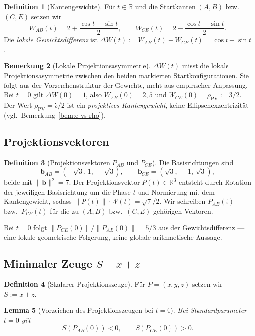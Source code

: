 \documentclass[11pt,a4paper]{article}
\theoremstyle{definition}
\newtheorem{definition}{Definition}[section]
\newtheorem{bemerkung}[definition]{Bemerkung}
\theoremstyle{plain}
\newtheorem{lemma}[definition]{Lemma}
\newcommand{\R}{\mathbb{R}}
\newcommand{\rhoPV}{\rho_{\mathrm{PV}}}
\begin{document}
	\begin{definition}[Kantengewichte]
		Für $t\in\R$ und die Startkanten $(A,B)$ bzw.\ $(C,E)$ setzen wir
		\[
		W_{AB}(t)=2+\frac{\cos t-\sin t}{2},
		\qquad
		W_{CE}(t)=2-\frac{\cos t-\sin t}{2}.
		\]
		Die \emph{lokale Gewichtsdifferenz} ist $\Delta W(t):=W_{AB}(t)-W_{CE}(t)=\cos t-\sin t$.
	\end{definition}
	
	\begin{bemerkung}[Lokale Projektionsasymmetrie]
		$\Delta W(t)$ misst die lokale Projektionsasymmetrie zwischen den beiden markierten Startkonfigurationen. Sie folgt aus der Vorzeichenstruktur der Gewichte, nicht aus empirischer Anpassung. Bei $t=0$ gilt $\Delta W(0)=1$, also $W_{AB}(0)=2{,}5$ und $W_{CE}(0)=\rhoPV:=3/2$. Der Wert $\rhoPV=3/2$ ist ein \emph{projektives Kantengewicht}, keine Ellipsenexzentrizität (vgl.\ Bemerkung~\ref{bem:e-vs-rho}).
	\end{bemerkung}
	
	\subsection{Projektionsvektoren}
	
	\begin{definition}[Projektionsvektoren $P_{AB}$ und $P_{CE}$]
		Die Basisrichtungen sind
		\[
		\mathbf{b}_{AB}=(-\sqrt{3},\,1,\,-\sqrt{3}),\qquad
		\mathbf{b}_{CE}=(\sqrt{3},\,-1,\,\sqrt{3}),
		\]
		beide mit $\|\mathbf{b}\|^2=7$. Der Projektionsvektor $P(t)\in\R^3$ entsteht durch Rotation der jeweiligen Basisrichtung um die Phase $t$ und Normierung mit dem Kantengewicht, sodass $\|P(t)\|\cdot W(t)=\sqrt{7}/2$. Wir schreiben $P_{AB}(t)$ bzw.\ $P_{CE}(t)$ für die zu $(A,B)$ bzw.\ $(C,E)$ gehörigen Vektoren.
	\end{definition}
	
	Bei $t=0$ folgt $\|P_{CE}(0)\|/\|P_{AB}(0)\|=5/3$ aus der Gewichtsdifferenz --- eine lokale geometrische Folgerung, keine globale arithmetische Aussage.
	
	\subsection{Minimaler Zeuge $S=x+z$}
	
	\begin{definition}[Skalarer Projektionszeuge]
		Für $P=(x,y,z)$ setzen wir $S:=x+z$.
	\end{definition}
	
	\begin{lemma}[Vorzeichen des Projektionszeugen bei $t=0$]\label{lemma:S-sign}
		Bei Standardparameter $t=0$ gilt
		\[
		S(P_{AB}(0))<0,\qquad S(P_{CE}(0))>0.
		\]
	\end{lemma}
	
\end{document}
